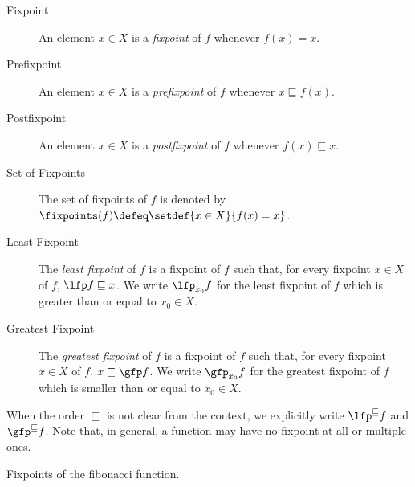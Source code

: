 \begin{description}
  \item[Fixpoint] An element $x \in X$ is a \emph{fixpoint} of $f$ whenever $f(x) = x$.
  \item[Prefixpoint] An element $x \in X$ is a \emph{prefixpoint} of $f$ whenever $x \sqsubseteq f(x)$.
  \item[Postfixpoint] An element $x \in X$ is a \emph{postfixpoint} of $f$ whenever $f(x) \sqsubseteq x$.
  \item[Set of Fixpoints] The set of fixpoints of $f$ is denoted by $\fixpoints(f) \defeq \setdef{x \in X}{f(x) = x}$.
  \item[Least Fixpoint] The \emph{least fixpoint} of $f$ is a fixpoint of $f$ such that, for every fixpoint $x \in X$ of $f$, $\lfp f \sqsubseteq x$. We write $\lfp_{x_0} f$ for the least fixpoint of $f$ which is greater than or equal to $x_0 \in X$.
  \item[Greatest Fixpoint] The \emph{greatest fixpoint} of $f$ is a fixpoint of $f$ such that, for every fixpoint $x \in X$ of $f$, $x \sqsubseteq \gfp f$. We write $\gfp_{x_0} f$ for the greatest fixpoint of $f$ which is smaller than or equal to $x_0 \in X$.
\end{description}

When the order $\sqsubseteq$ is not clear from the context, we explicitly write $\lfp^{\sqsubseteq} f$ and $\gfp^{\sqsubseteq} f$. Note that, in general, a function may have no fixpoint at all or multiple ones.

\begin{marginfigure}
\caption{Fixpoints of the fibonacci function.}
\end{marginfigure}

